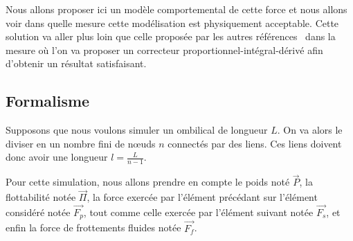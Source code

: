 				Nous allons proposer ici un modèle comportemental de cette force et nous allons voir dans quelle mesure cette modélisation est physiquement acceptable. Cette solution va aller plus loin que celle proposée par les autres références~\cite{ganoni_unreal,blintsov_development_2017} dans la mesure où l'on va proposer un correcteur proportionnel-intégral-dérivé afin d'obtenir un résultat satisfaisant.

			\subsection{Formalisme}

				Supposons que nous voulons simuler un ombilical de longueur $L$. On va alors le diviser en un nombre fini de n\oe uds $n$ connectés par des liens. Ces liens doivent donc avoir une longueur $l=\frac{L}{n-1}$.
			
				Pour cette simulation, nous allons prendre en compte le poids noté $\overrightarrow{P}$, la flottabilité notée $\overrightarrow{\Pi}$, la force exercée par l'élément précédant sur l'élément considéré notée $\overrightarrow{F_p}$, tout comme celle exercée par l'élément suivant notée $\overrightarrow{F_s}$, et enfin la force de frottements fluides notée $\overrightarrow{F_f}$.
				
